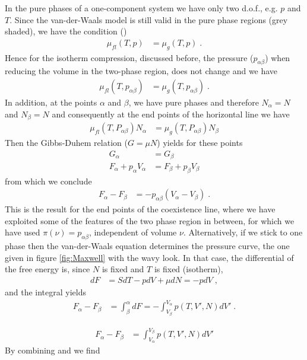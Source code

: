 In the pure phases of a one-component system we have only two d.o.f., e.g.
$p$ and $T$.
Since the van-der-Waals model is still valid in the pure phase regions (grey shaded),
we have the condition ()
%
\begin{align*}
\mu_{fl}(T,p) &= \mu_{g}(T,p)\;.
\end{align*}
%
Hence for the isotherm compression, discussed before, the pressure  ($p_{\alpha\beta}$) when reducing the volume in the two-phase region, does not change and we have
%
\begin{align*}
\mu_{fl}(T,p_{\alpha\beta}) &=\mu_{g}(T,p_{\alpha\beta})\;.
\end{align*}
%
In addition, at the points $\alpha$ and $\beta$, we have pure phases and therefore $N_{\alpha}=N$ and $N_{\beta}=N$ and consequently at the end points of the horizontal line we have
%
\begin{align*}
\mu_{fl}(T,P_{\alpha\beta}) N_{\alpha} &=\mu_{g}(T,P_{\alpha\beta}) N_{\beta}
\end{align*}
%
Then the Gibbs-Duhem relation ($G=\mu N$)  yields for these points
%
\begin{align*}
G_{\alpha} &= G_{\beta}\\
F_{\alpha} + p_{\alpha}V_{\alpha} &=F_{\beta} + p_{\beta} V_{\beta} 
\end{align*}
%
from which we conclude
%
\begin{align}\label{eq:DF:DV}
F_{\alpha}-F_{\beta} &= -p_{\alpha\beta}(V_{\alpha}-V_{\beta})\;.
\end{align}
%
This is the result for the end points of the coexistence line, where we have exploited some of the features of the  two phase region in between, for which we have used $\pi(\nu) = p_{\alpha\beta}$, independent of volume $\nu$.
Alternatively, if we stick to one phase then the van-der-Waals equation determines the pressure curve, the one given in figure \ref{fig:Maxwell} with the wavy look.
In that case, the differential of the free energy is, since $N$ is fixed and $T$ is fixed (isotherm),
%
\begin{align*}
dF &= S dT - pdV +\mu dN = -pdV\;,
\end{align*}
%
and the integral yields
%
\begin{align*}
F_{\alpha}-F_{\beta} &= \int_{{\beta}}^{\alpha} dF =
- \int_{V_{\beta}}^{V_{\alpha}} p(T,V',N)  dV' \;.
\end{align*}
%

%
\begin{align}\label{eq:DF:DV:2}
F_{\alpha}-F_{\beta} &= \int_{V_{\alpha}}^{V_{\beta}} p(T,V',N)  dV' 
\end{align}
%
By combining  and  we find

